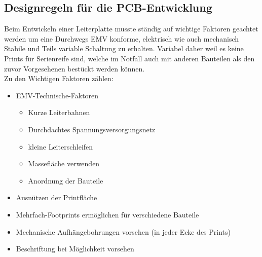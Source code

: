 \subsection{Designregeln für die PCB-Entwicklung}\label{subsec:3.1.2}
Beim Entwickeln einer Leiterplatte musste ständig auf wichtige Faktoren geachtet werden um eine Durchwegs EMV konforme, elektrisch wie auch mechanisch Stabile und Teils variable Schaltung zu erhalten. Variabel daher weil es keine Prints für Serienreife sind, welche im Notfall auch mit anderen Bauteilen als den zuvor Vorgesehenen bestückt werden können.\\
Zu den Wichtigen Faktoren zählen:
\begin{itemize}
	\item EMV-Technische-Faktoren
	\begin{itemize}
		\item Kurze Leiterbahnen
		\item Durchdachtes Spannungsversorgungsnetz
		\item kleine Leiterschleifen
		\item Massefläche verwenden
		\item Anordnung der Bauteile
	\end{itemize}
	\item Ausnützen der Printfläche
	\item Mehrfach-Footprints ermöglichen für verschiedene Bauteile
	\item Mechanische Aufhängebohrungen vorsehen (in jeder Ecke des Prints)
	\item Beschriftung bei Möglichkeit vorsehen
\end{itemize}


